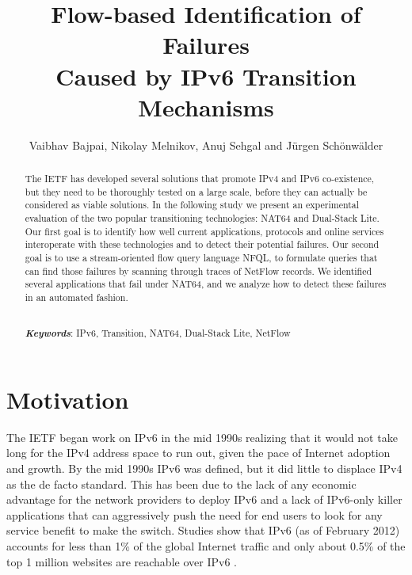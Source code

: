 \documentclass{llncs}
\newcommand{\Keywords}[1]{\par\noindent 
{\small{\em \bf{\\Keywords}\/}: #1}}
\begin{document}
\mainmatter  %

\title{Flow-based Identification of Failures\\
  Caused by IPv6 Transition Mechanisms}

\author{Vaibhav Bajpai, Nikolay Melnikov, Anuj Sehgal and J\"urgen Sch\"onw\"alder}
\maketitle

\begin{abstract}
The IETF has developed several solutions that promote IPv4 and IPv6 co-existence, but they need to be thoroughly tested on a large scale, before they can actually be considered as viable solutions. In the following study we present an experimental evaluation of the two popular transitioning technologies: NAT64 and Dual-Stack Lite. Our first goal is to identify how well current applications, protocols and online services interoperate with these technologies and to detect their potential failures. Our second goal is to use a stream-oriented flow query language NFQL, to formulate queries that can find those failures by scanning through traces of NetFlow records. We identified several applications that fail under NAT64, and we analyze how to detect these failures in an automated fashion.

\Keywords{IPv6, Transition, NAT64, Dual-Stack Lite, NetFlow}
\end{abstract}

\section{Motivation}
\label{sec:introduction}

The IETF began work on IPv6 in the mid 1990s realizing that it would not take long for the IPv4 address space to run out, given the pace of Internet adoption and growth. By the mid 1990s IPv6 was defined, but it did little to displace IPv4 as the de facto standard. This has been due to the lack of any economic advantage for the network providers to deploy IPv6 and a lack of IPv6-only killer applications that can aggressively push the need for end users to look for any service benefit to make the switch. Studies show that IPv6 (as of February 2012) accounts for less than 1\% of the global Internet traffic and only about 0.5\% of the top 1 million websites are reachable over IPv6 \cite{ipv6monitor}. 
\end{document}
